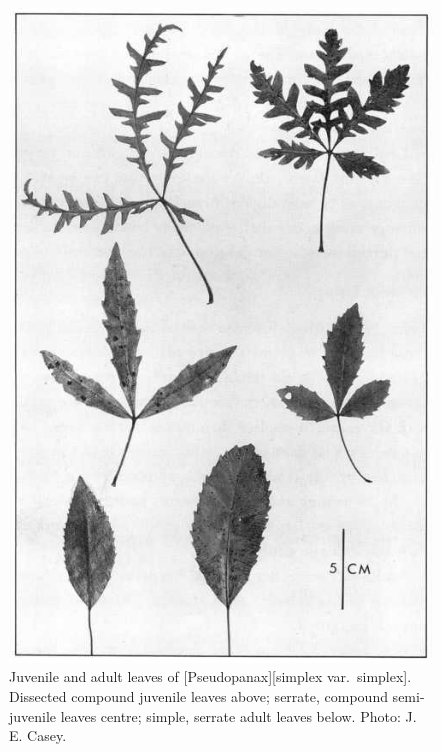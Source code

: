 \begin{figure}[!htb]
	\centering
	\begin{minipage}[t]{0.475\textwidth}
		\centering
		\includegraphics[height=1.4\textwidth]{graphics/figure18pseudopanax.jpg}
    	\caption[Juvenile and adult leaves of \emph{Pseudopanax simplex var.\ simplex}]{Juvenile and adult leaves of [Pseudopanax][simplex var.\ simplex].
        Dissected compound juvenile leaves above; serrate, compound semi-juvenile leaves centre; simple, serrate adult leaves below.
    	Photo: J. E. Casey.}%
    	\label{fig:18pseudopanax}
	\end{minipage}\hfill%
	\begin{minipage}[t]{0.475\textwidth}
    	\centering

\end{minipage}
\end{figure}
